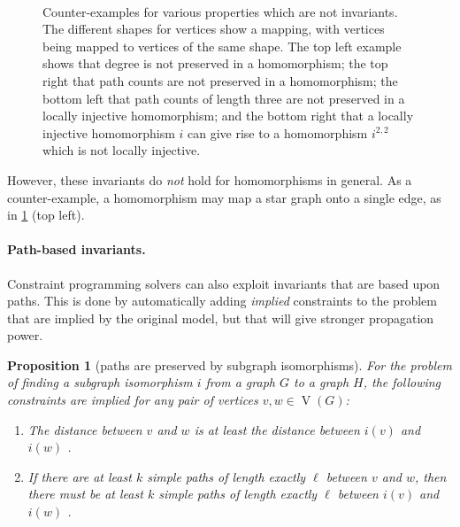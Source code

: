 \documentclass{article}
\newtheorem{proposition}{Proposition}
\newcommand{\vertexset}{\operatorname{V}}
\begin{document}
\begin{figure}
\begin{minipage}{3cm}
\end{minipage}\hfill\,

    \caption{Counter-examples for various properties which are not invariants. The different shapes
        for vertices show a mapping, with vertices being mapped to vertices of the same shape. The
        top left example shows that degree is not preserved in a homomorphism; the top right that path
        counts are not preserved in a homomorphism; the bottom left that path counts of length three
        are not preserved in a locally injective homomorphism; and the bottom right that a locally
        injective homomorphism $i$ can give rise to a homomorphism $i^{2,2}$ which is not locally
        injective.} \label{figure:counterexamples}
\end{figure}

However, these invariants do \emph{not} hold for homomorphisms in general. As a
counter-example, a homomorphism may map a star graph onto a single edge, as in
\cref{figure:counterexamples} (top left).

\paragraph{Path-based invariants.} Constraint programming solvers can also exploit
invariants that are based upon paths. This is done by automatically adding \emph{implied}
constraints to the problem that are implied by the original model, but that will give stronger
propagation power.

\begin{proposition}[paths are preserved by subgraph isomorphisms]\label{proposition:distances}For
    the problem of finding a subgraph isomorphism $i$ from a graph $G$ to a graph $H$, the following
    constraints are implied for any pair of vertices $v, w \in \vertexset(G)$:
    \begin{enumerate}
        \item The distance between $v$ and $w$ is at least the distance between $i(v)$ and $i(w)$
            \cite{DBLP:conf/cp/AudemardLMGP14}.
        \item If there are at least $k$ simple
            paths of length exactly $\ell$ between $v$ and $w$, then there must be at least $k$
            simple paths of length exactly $\ell$ between $i(v)$ and $i(w)$
            \cite{DBLP:conf/cp/McCreeshP15}.
    \end{enumerate}
\end{proposition}
\end{document}

